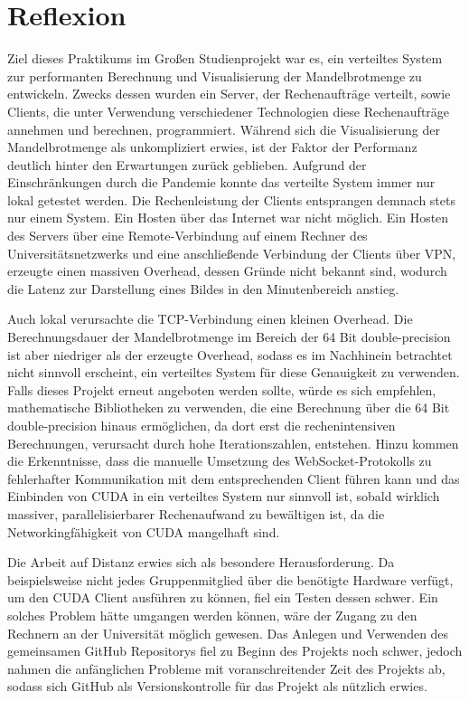 \documentclass[12pt, onecolumn, notitlepage]{scrartcl}
\begin{document}
\section{Reflexion}
Ziel dieses Praktikums im Großen Studienprojekt war es, ein verteiltes System zur performanten Berechnung und Visualisierung der Mandelbrotmenge zu entwickeln. Zwecks dessen wurden ein Server, der Rechenaufträge verteilt, sowie Clients, die unter Verwendung verschiedener Technologien diese Rechenaufträge annehmen und berechnen, programmiert. Während sich die Visualisierung der Mandelbrotmenge als unkompliziert erwies, ist der Faktor der Performanz deutlich hinter den Erwartungen zurück geblieben. Aufgrund der Einschränkungen durch die Pandemie konnte das verteilte System immer nur lokal getestet werden. Die Rechenleistung der Clients entsprangen demnach stets nur einem System. Ein Hosten über das Internet war nicht möglich. Ein Hosten des Servers über eine Remote-Verbindung auf einem Rechner des Universitätsnetzwerks und eine anschließende Verbindung der Clients über VPN, erzeugte einen massiven Overhead, dessen Gründe nicht bekannt sind, wodurch die Latenz zur Darstellung eines Bildes in den Minutenbereich anstieg. \par 
Auch lokal verursachte die TCP-Verbindung einen kleinen Overhead. Die Berechnungsdauer der Mandelbrotmenge im Bereich der 64 Bit double-precision ist aber niedriger als der erzeugte Overhead, sodass es im Nachhinein betrachtet nicht sinnvoll erscheint, ein verteiltes System für diese Genauigkeit zu verwenden. Falls dieses Projekt erneut angeboten werden sollte, würde es sich empfehlen, mathematische Bibliotheken zu verwenden, die eine Berechnung über die 64 Bit double-precision hinaus ermöglichen, da dort erst die rechenintensiven Berechnungen, verursacht durch hohe Iterationszahlen, entstehen. Hinzu kommen die Erkenntnisse, dass die manuelle Umsetzung des WebSocket-Protokolls zu fehlerhafter Kommunikation mit dem entsprechenden Client führen kann und das Einbinden von CUDA in ein verteiltes System nur sinnvoll ist, sobald wirklich massiver, parallelisierbarer Rechenaufwand zu bewältigen ist, da die Networkingfähigkeit von CUDA mangelhaft sind. \par 
Die Arbeit auf Distanz erwies sich als besondere Herausforderung. Da beispielsweise nicht jedes Gruppenmitglied über die benötigte Hardware verfügt, um den CUDA Client ausführen zu können, fiel ein Testen dessen schwer. Ein solches Problem hätte umgangen werden können, wäre der Zugang zu den Rechnern an der Universität möglich gewesen. Das Anlegen und Verwenden des gemeinsamen GitHub Repositorys fiel zu Beginn des Projekts noch schwer, jedoch nahmen die anfänglichen Probleme mit voranschreitender Zeit des Projekts ab, sodass sich GitHub als Versionskontrolle für das Projekt als nützlich erwies.

\nocite{*}
\end{document}
